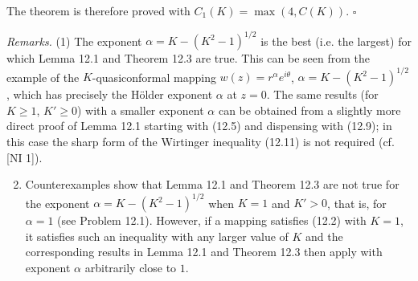 \noindent The theorem is therefore proved with $C_1(K)=\max(4, C(K))$. \hfill $\square$

\medskip

\noindent\textit{Remarks.} (1) The exponent $\alpha=K-(K^2-1)^{1/2}$ is the best (i.e. the largest) for which Lemma 12.1 and Theorem 12.3 are true. This can be seen from the example of the $K$-quasiconformal mapping $w(z)=r^{\alpha}e^{i\theta}$, $\alpha=K-(K^2-1)^{1/2}$, which has precisely the H\"older exponent $\alpha$ at $z=0$. The same results (for $K\geq 1$, $K'\geq 0$) with a smaller exponent $\alpha$ can be obtained from a slightly more direct proof of Lemma 12.1 starting with (12.5) and dispensing with (12.9); in this case the sharp form of the Wirtinger inequality (12.11) is not required (cf. [NI 1]).

\begin{enumerate}
\setcounter{enumi}{1}
\item Counterexamples show that Lemma 12.1 and Theorem 12.3 are not true for the exponent $\alpha=K-(K^2-1)^{1/2}$ when $K=1$ and $K'>0$, that is, for $\alpha=1$ (see Problem 12.1). However, if a mapping satisfies (12.2) with $K=1$, it satisfies such an inequality with any larger value of $K$ and the corresponding results in Lemma 12.1 and Theorem 12.3 then apply with exponent $\alpha$ arbitrarily close to $1$.
\end{enumerate}



